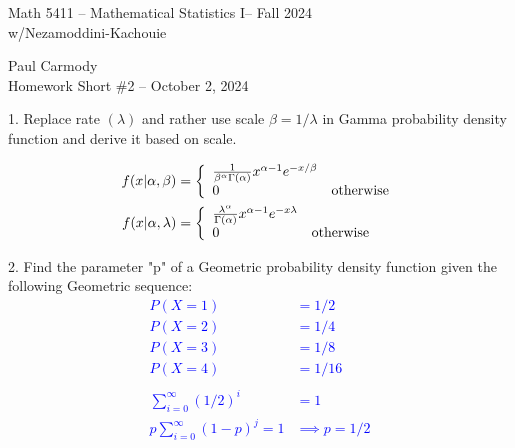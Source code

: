 \documentclass[10pt,a4paper]{report}
\newcommand{\CLASSNAME}{Math 5411 -- Mathematical Statistics I}
\newcommand{\PROFESSOR}{Nezamoddini-Kachouie}
\newcommand{\STUDENTNAME}{Paul Carmody}
\newcommand{\ASSIGNMENT}{Homework Short \#2 }
\newcommand{\DUEDATE}{October 2, 2024}
\newcommand{\SEMESTER}{Fall 2024}
\newcommand{\BLUE}[1]{\textcolor{blue}{#1}}
\begin{document}
\begin{center}
	\Large{\CLASSNAME -- \SEMESTER} \\
	\large{w/\PROFESSOR}
\end{center}
\begin{center}
	\STUDENTNAME \\
	\ASSIGNMENT -- \DUEDATE\\
\end{center}

1. Replace rate $(\lambda)$ and rather use scale $\beta = 1/\lambda$ in Gamma probability density function and derive it based on scale.  

\BLUE{\begin{align*}
	f(x|\alpha,\beta) &= \left \{ \begin{array}{ll} \frac{1}{\beta^\alpha \Gamma(\alpha)}x^{\alpha-1}e^{-x/\beta}\\ 0& \text{otherwise} \end{array} \right . \\
	f(x|\alpha,\lambda)&= \left \{ \begin{array}{ll} \frac{\lambda^{\alpha}}{ \Gamma(\alpha)}  x^{\alpha-1}e^{-x\lambda}\\ 0& \text{otherwise} \end{array} \right . 
\end{align*}
}
 

2. Find the parameter "p" of a Geometric probability density function given the following Geometric sequence:
\BLUE{\begin{align*}
P(X = 1) &= 1/2 \\
P(X = 2) &= 1/4\\
P(X = 3) &= 1/8\\
P(X = 4) &= 1/16\\
	\\
	\sum_{i=0}^\infty (1/2)^i &= 1 \\
	p\sum_{i=0}^\infty (1-p)^j = 1 &\implies p = 1/2
\end{align*}
}
\end{document}

